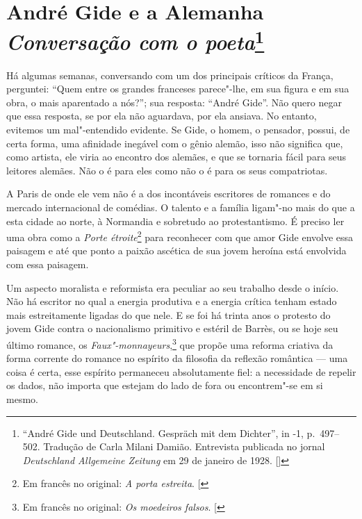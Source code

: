\chapter*{André Gide e a Alemanha\\
\emph{Conversação com o poeta}\footnote[*]{``André Gide und Deutschland. Gespräch mit dem Dichter'', in -1, p.~497--502. Tradução de Carla Milani Damião. Entrevista publicada no jornal \emph{Deutschland Allgemeine Zeitung} em 29 de janeiro de 1928. []}}


Há algumas semanas, conversando com um dos principais críticos da
França, perguntei: ``Quem entre os grandes franceses parece"-lhe, em sua
figura e em sua obra, o mais aparentado a nós?''; sua resposta:
``André Gide''. Não quero negar que essa resposta, se por ela não
aguardava, por ela ansiava. No entanto, evitemos um mal"-entendido
evidente. Se Gide, o homem, o pensador, possui, de certa forma, uma
afinidade inegável com o gênio alemão, isso não significa que, como
artista, ele viria ao encontro dos alemães, e que se tornaria fácil para
seus leitores alemães. Não o é para eles como não o é para os seus
compatriotas.

A Paris de onde ele vem não é a dos incontáveis ​​escritores de romances
e do mercado internacional de comédias. O talento e a família ligam"-no
mais do que a esta cidade ao norte, à Normandia e sobretudo ao
protestantismo. É preciso ler uma obra como a \emph{Porte étroite}\footnote{Em francês no original: \emph{A porta estreita}. {[}\versal{N.~T.}{]}} para
reconhecer com que amor Gide envolve essa paisagem e até que ponto a
paixão ascética de sua jovem heroína está envolvida com essa paisagem.

Um aspecto moralista e reformista era peculiar ao seu trabalho desde o
início. Não há escritor no qual a energia produtiva e a energia crítica
tenham estado mais estreitamente ligadas do que nele. E se foi há trinta
anos o protesto do jovem Gide contra o nacionalismo primitivo e estéril
de Barrès, ou se hoje seu último romance, os \emph{Faux"-monnayeurs},\footnote{Em francês no original: \emph{Os moedeiros falsos}. {[}\versal{N.~T.}{]}}
que propõe uma reforma criativa da forma corrente do romance no
espírito da filosofia da reflexão romântica --- uma coisa é certa, esse
espírito permaneceu absolutamente fiel: a necessidade de repelir os
dados, não importa que estejam do lado de fora ou encontrem"-se em si
mesmo.


